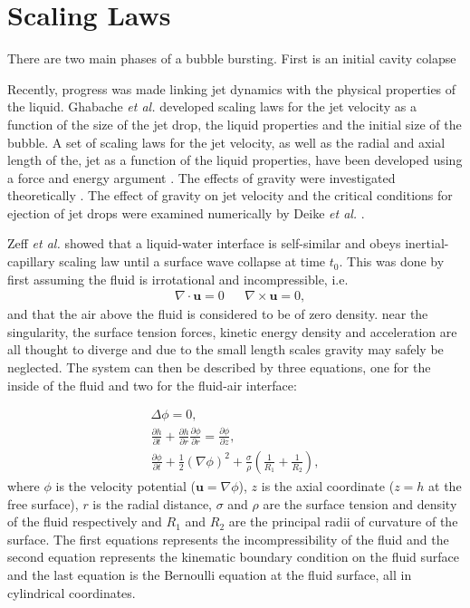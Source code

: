 \section{Scaling Laws}

There are two main phases of a bubble bursting. First is an initial cavity colapse

Recently, progress was made linking jet dynamics with the physical properties of the liquid. Ghabache \textit{et al.} \cite{ghabache2014physics} developed scaling laws for the jet velocity as a function of the size of the jet drop, the liquid properties and the initial size of the bubble. A set of scaling laws
for the jet velocity, as well as the radial and axial length of
the, jet as a function of the liquid properties, have been
developed using a force and energy argument \cite{ganan2017revision}. The
effects of gravity were investigated theoretically \cite{ganan2018scaling}. The
effect of gravity on jet velocity and the critical conditions
for ejection of jet drops were examined numerically by
Deike \textit{et al.} \cite{deike2018dynamics}.

Zeff \textit{et al.} \cite{zeff2000singularity} showed that a liquid-water interface is self-similar
and obeys inertial-capillary scaling law until a surface wave collapse at time $t_0$. This was done by first assuming the fluid is irrotational and incompressible, i.e.
\begin{align}
    &\nabla \cdot \textbf{u}=0&&\nabla \times \textbf{u}=0,
\end{align}
and that the air above the fluid is considered to be of zero density. near the singularity, the surface tension forces, kinetic energy density and acceleration are all thought to diverge and due to the small length scales gravity may safely be neglected. The system can then be described by three equations, one for the inside of the fluid and two for the fluid-air interface:

\begin{gather}\label{scaling euqations 1}
    \Delta\phi=0,\\ \label{scaling euqations 2}
    \frac{\partial h}{\partial t}+\frac{\partial h}{\partial r}\frac{\partial \phi}{\partial r}=\frac{\partial \phi}{\partial z},\\ \label{scaling euqations 3}
    \frac{\partial \phi}{\partial t} + \frac{1}{2}(\nabla \phi)^2 + \frac{\sigma}{\rho}(\frac{1}{R_1}+\frac{1}{R_2}),
\end{gather}
where $\phi$ is the velocity potential ($\textbf{u}=\nabla \phi$), $z$ is the axial coordinate ($z=h$ at the free surface), $r$ is the radial distance, $\sigma$ and $\rho$ are the surface tension and density of the fluid respectively and $R_1$ and $R_2$ are the principal radii of curvature of the surface. The first equations represents the incompressibility of the fluid and the second equation represents the kinematic boundary condition on the fluid surface and the last equation is the Bernoulli equation at the fluid surface, all in cylindrical coordinates.

